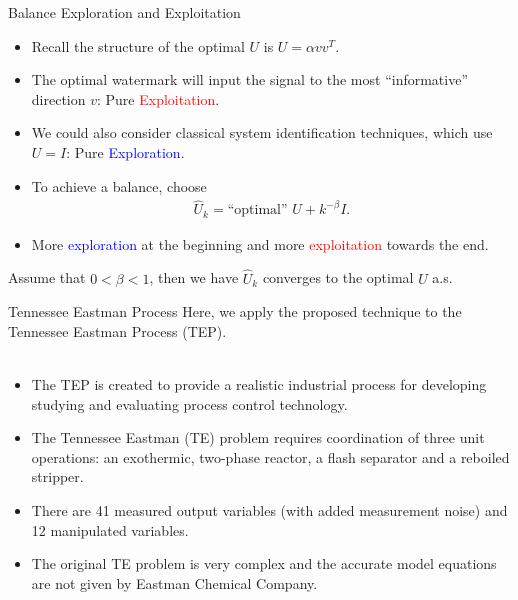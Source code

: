 \documentclass[10pt]{beamer}
\begin{document}
\begin{frame}{Balance Exploration and Exploitation}
  \begin{itemize}
  \item Recall the structure of the optimal $U$ is $U = \alpha v v^T$.
  \item The optimal watermark will input the signal to the most ``informative'' direction $v$: Pure \textcolor{red}{Exploitation}.
  \item We could also consider classical system identification techniques, which use $U=I$: Pure \textcolor{blue}{Exploration}.
  \item To achieve a balance, choose
    \begin{align*}
      \hat U_k = \text{``optimal'' } U + k^{-\beta} I.
    \end{align*}
  \item More \textcolor{blue}{exploration} at the beginning and more \textcolor{red}{exploitation} towards the end.
  \end{itemize}
  \begin{theorem}
    Assume that $0 < \beta <1$, then we have $\hat U_k$ converges to the optimal $U$ a.s.
    
  \end{theorem}
\end{frame}



\begin{frame}{Tennessee Eastman Process}
  Here, we apply the proposed technique to the Tennessee Eastman Process (TEP).\\~\\
  \begin{itemize}
  \item The TEP is created to provide a realistic industrial process for developing studying and evaluating process control technology. 
  \item The Tennessee Eastman (TE) problem requires coordination of three unit operations: an exothermic, two-phase reactor, a flash separator and a reboiled  stripper.
  \item There are 41 measured output variables (with added measurement noise) and 12 manipulated variables.
  \item The original TE problem is very complex and the accurate model equations are not given by Eastman Chemical Company.   
  \end{itemize}
\end{frame}
\end{document}

